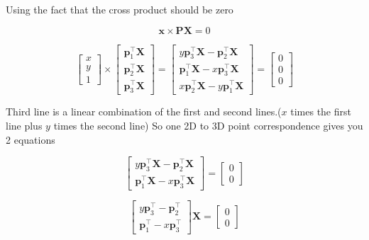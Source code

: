 

Using the fact that the cross product should be zero

\[
	\mathbf{x} \times \mathbf{P} \mathbf{X} = 0
\]

\[
	\begin{bmatrix} x \\ y \\ 1 \end{bmatrix} \times \begin{bmatrix} \mathbf{p}_1^{\top} \mathbf{X} \\ \mathbf{p}_2^{\top} \mathbf{X} \\ \mathbf{p}_3^{\top} \mathbf{X} \end{bmatrix} = \begin{bmatrix} y \mathbf{p}_3^{\top} \mathbf{X} - \mathbf{p}_2^{\top} \mathbf{X} \\ \mathbf{p}_1^{\top} \mathbf{X} - x \mathbf{p}_3^{\top} \mathbf{X} \\ x \mathbf{p}_2^{\top} \mathbf{X} - y \mathbf{p}_1^{\top} \mathbf{X} \end{bmatrix} = \begin{bmatrix} 0 \\ 0 \\ 0 \end{bmatrix}
\]

Third line is a linear combination of the first and second lines.($x$ times the first line plus $y$ times the second line)
So one 2D to 3D point correspondence gives you 2 equations

\[
	\begin{bmatrix} y \mathbf{p}_3^{\top} \mathbf{X} - \mathbf{p}_2^{\top} \mathbf{X} \\ \mathbf{p}_1^{\top} \mathbf{X} - x \mathbf{p}_3^{\top} \mathbf{X} \end{bmatrix} = \begin{bmatrix} 0 \\ 0 \end{bmatrix}
\]

\[
	\begin{bmatrix} y \mathbf{p}_3^{\top} - \mathbf{p}_2^{\top} \\ \mathbf{p}_1^{\top} - x \mathbf{p}_3^{\top} \end{bmatrix} \mathbf{X} = \begin{bmatrix} 0 \\ 0 \end{bmatrix}
\]

